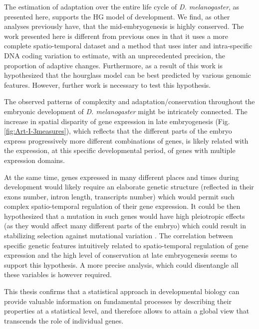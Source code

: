 The estimation of adaptation over the entire life cycle of \textit{D. melanogaster}, as presented here, supports the HG model of development. We find, as other analyses previously have, that the mid-embryogenesis is highly conserved. The work presented here is different from previous ones in that it uses a more complete spatio-temporal dataset and a method that uses inter and intra-specific DNA coding variation to estimate, with an unprecedented precision, the proportion of adaptive changes.
Furthermore, as a result of this work is hypothesized that the hourglass model can be best predicted by various genomic features. However, further work is necessary to test this hypothesis.

The observed patterns of complexity and adaptation/conservation throughout the embryonic development of \textit{D. melanogaster} might be intricately connected.
%
The increase in spatial disparity of gene expression in late embryogenesis (Fig. \ref{fig:Art-I-3measures}),
which reflects that the different parts of the embryo express progressively more different combinations of genes, 
is likely related with the expression, at this specific developmental period, of genes with multiple expression domains.

At the same time, genes expressed in many different places and times during development would likely require an elaborate genetic structure (reflected in their exons number, intron length, transcripts number) which would permit such complex spatio-temporal regulation of their gene expression.
%
%
It could be then hypothesized that a mutation in such genes would have high pleiotropic effects (as they would affect many different parts of the embryo) which could result in stabilizing selection against mutational variation \citep{Galis2002}.
The correlation between specific genetic features intuitively related to spatio-temporal regulation of gene expression and the high level of conservation at late embryogenesis seems to support this hypothesis. A more precise analysis, which could disentangle all these variables is however required.

%

This thesis confirms that a statistical approach in developmental biology can provide valuable information on fundamental processes by describing their properties at a statistical level, and therefore allows to attain a global view that transcends the role of individual genes.


